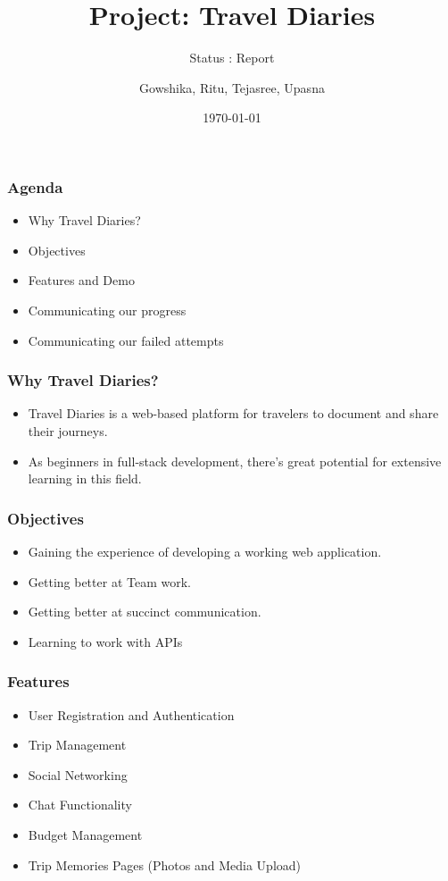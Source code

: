 \documentclass{beamer}
\title{Project: Travel Diaries}
\subtitle{Status : Report}
\author{Gowshika, Ritu, Tejasree, Upasna}
\date{\today}
\begin{document}
\frame{\titlepage}

\begin{frame}
    \frametitle{Agenda}
    \begin{itemize}
      \item Why Travel Diaries?
      \item Objectives
      \item Features and Demo
      \item Communicating our progress
      \item Communicating our failed attempts
    \end{itemize}
    \end{frame}

\begin{frame}
    \frametitle{Why Travel Diaries?}
    \begin{itemize}
        \item Travel Diaries is a web-based platform for travelers to document and share their journeys.
        \item As beginners in full-stack development, there's great potential for extensive learning in this field.
    \end{itemize}
\end{frame}

\begin{frame}
  \frametitle{Objectives}
  \begin{itemize}
    \item Gaining the experience of developing a working web application.
    \item Getting better at Team work.
    \item Getting better at succinct communication.
    \item Learning to work with APIs
  \end{itemize}
\end{frame}

\begin{frame}
  \frametitle{Features}
  \begin{itemize}
    \item User Registration and Authentication
    \item Trip Management
    \item Social Networking
    \item Chat Functionality
    \item Budget Management
    \item Trip Memories Pages (Photos and Media Upload)
  \end{itemize}
\end{frame}
\end{document}
